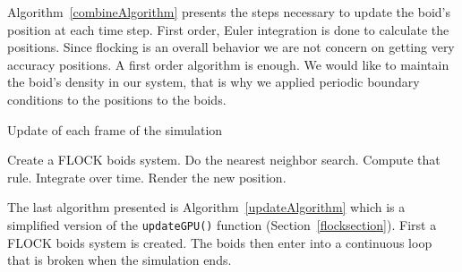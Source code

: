 Algorithm~\ref{combineAlgorithm} presents the steps necessary to update the boid's position at each time step. First order, Euler integration is done to calculate the positions. Since flocking is an overall behavior we are not concern on getting very accuracy positions. A first order algorithm is enough. We would like to maintain the boid's density in our system, that is why we applied periodic boundary conditions to the positions to the boids.
 
\begin{algorithm}
\caption{Update of each frame of the simulation}
\label{updateAlgorithm}
\begin{algorithmic}
\STATE Create a FLOCK boids system.
\STATE Do the nearest neighbor search.
\STATE Compute that rule.
\STATE Integrate over time.
\STATE Render the new position.
\ENDFOR
\end{algorithmic}
\end{algorithm}

The last algorithm presented is Algorithm~\ref{updateAlgorithm} which is a simplified version of 
the \texttt{updateGPU()} function (Section~\ref{flocksection}). First a FLOCK boids system is created. The boids then enter into a continuous loop that is broken when the simulation ends. 

